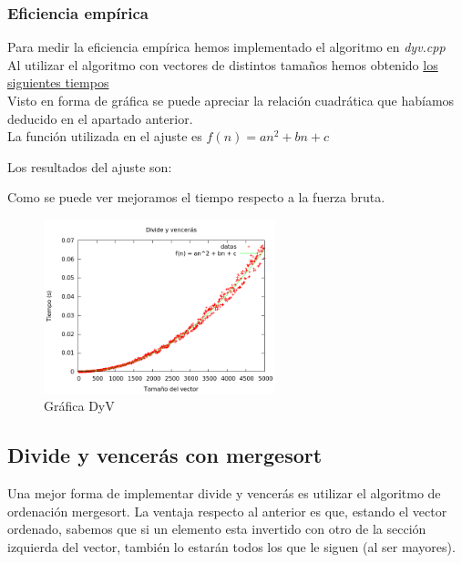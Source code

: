 \subsubsection{Eficiencia empírica}
Para medir la eficiencia empírica hemos implementado el algoritmo en \textit{dyv.cpp}\\

Al utilizar el algoritmo con vectores de distintos tamaños hemos obtenido \hyperref[tabla_comp]{{\color{blue} los siguientes tiempos}}\\

Visto en forma de gráfica se puede apreciar la relación cuadrática que habíamos deducido en el apartado anterior.\\

La función utilizada en el ajuste es $f(n) = an^2+bn+c$

Los resultados del ajuste son:\\

\begin{center}
\end{center}

Como se puede ver mejoramos el tiempo respecto a la fuerza bruta.

\begin{figure}[h] 
\centering
	\includegraphics[width=0.6\textwidth]{../Opcional/Graficas/dyv_bruno.png}
	\caption{Gráfica DyV} 
	\label{fig:perros} 
\end{figure}


\subsection{Divide y vencerás con mergesort}
Una mejor forma de implementar divide y vencerás es utilizar el algoritmo de ordenación mergesort. La ventaja respecto al anterior es que, estando el vector ordenado, sabemos que si un elemento esta invertido con otro de la sección izquierda del vector, también lo estarán todos los que le siguen (al ser mayores).

